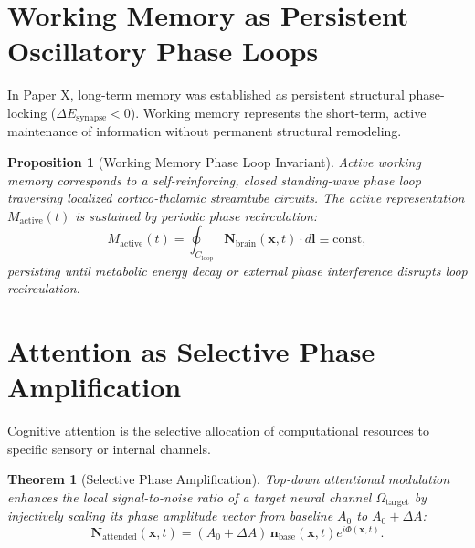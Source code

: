 \documentclass[11pt,a4paper]{article}
\newtheorem{prop}{Proposition}
\newtheorem{thm}{Theorem}
\begin{document}
	\section{Working Memory as Persistent Oscillatory Phase Loops}
	\label{sec:working_memory}
	
	In Paper X, long-term memory was established as persistent structural phase-locking ($\Delta E_{\text{synapse}} < 0$). Working memory represents the short-term, active maintenance of information without permanent structural remodeling.
	
	\begin{prop}[Working Memory Phase Loop Invariant]
		\label{prop:working_memory_loop}
		Active working memory corresponds to a self-reinforcing, closed standing-wave phase loop traversing localized cortico-thalamic streamtube circuits. The active representation $M_{\text{active}}(t)$ is sustained by periodic phase recirculation:
		\begin{equation}
			M_{\text{active}}(t) = \oint_{C_{\text{loop}}} \mathbf{N}_{\text{brain}}(\mathbf{x}, t) \cdot d\mathbf{l} \equiv \text{const},
			\label{eq:working_memory_loop_integral}
		\end{equation}
		persisting until metabolic energy decay or external phase interference disrupts loop recirculation.
	\end{prop}
	
	\section{Attention as Selective Phase Amplification}
	\label{sec:attention_mechanics}
	
	Cognitive attention is the selective allocation of computational resources to specific sensory or internal channels.
	
	\begin{thm}[Selective Phase Amplification]
		\label{thm:attention_amplification}
		Top-down attentional modulation enhances the local signal-to-noise ratio of a target neural channel $\Omega_{\text{target}}$ by injectively scaling its phase amplitude vector from baseline $A_0$ to $A_0 + \Delta A$:
		\begin{equation}
			\mathbf{N}_{\text{attended}}(\mathbf{x}, t) = (A_0 + \Delta A) \, \mathbf{n}_{\text{base}}(\mathbf{x}, t) e^{i \Phi(\mathbf{x}, t)}.
			\label{eq:attention_scaling_formula}
		\end{equation}
	\end{thm}
	
\end{document}
